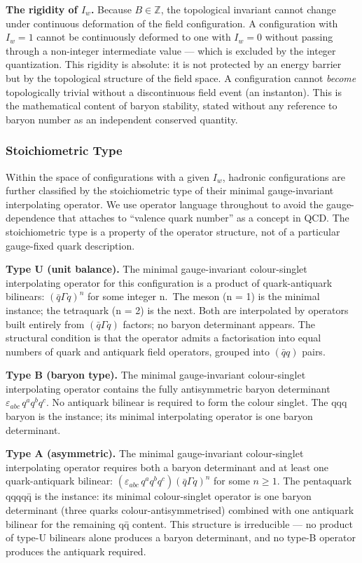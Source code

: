 \textbf{The rigidity of \(I_w\).} Because \(B \in \mathbb{Z}\), the
topological invariant cannot change under continuous deformation of the
field configuration. A configuration with \(I_w = 1\) cannot be
continuously deformed to one with \(I_w = 0\) without passing through a
non-integer intermediate value --- which is excluded by the integer
quantization. This rigidity is absolute: it is not protected by an
energy barrier but by the topological structure of the field space. A
configuration cannot \emph{become} topologically trivial without a
discontinuous field event (an instanton). This is the mathematical
content of baryon stability, stated without any reference to baryon
number as an independent conserved quantity.

\hypertarget{stoichiometric-type}{%
\subsubsection{Stoichiometric Type}\label{stoichiometric-type}}

Within the space of configurations with a given \(I_w\), hadronic
configurations are further classified by the stoichiometric type of
their minimal gauge-invariant interpolating operator. We use operator
language throughout to avoid the gauge-dependence that attaches to
``valence quark number'' as a concept in QCD. The stoichiometric type is
a property of the operator structure, not of a particular gauge-fixed
quark description.

\textbf{Type U (unit balance).} The minimal gauge-invariant
colour-singlet interpolating operator for this configuration is a
product of quark-antiquark bilinears: \((\bar{q}\Gamma q)^n\) for some
integer n.~The meson (n = 1) is the minimal instance; the tetraquark (n
= 2) is the next. Both are interpolated by operators built entirely from
\((\bar{q}\Gamma q)\) factors; no baryon determinant appears. The
structural condition is that the operator admits a factorisation into
equal numbers of quark and antiquark field operators, grouped into
\((\bar{q}q)\) pairs.

\textbf{Type B (baryon type).} The minimal gauge-invariant
colour-singlet interpolating operator contains the fully antisymmetric
baryon determinant \(\varepsilon_{abc}\,q^a q^b q^c\). No antiquark
bilinear is required to form the colour singlet. The qqq baryon is the
instance; its minimal interpolating operator is one baryon determinant.

\textbf{Type A (asymmetric).} The minimal gauge-invariant colour-singlet
interpolating operator requires both a baryon determinant and at least
one quark-antiquark bilinear:
\((\varepsilon_{abc}\,q^a q^b q^c)(\bar{q}\Gamma q)^n\) for some
\(n \geq 1\). The pentaquark qqqqq̄ is the instance: its minimal
colour-singlet operator is one baryon determinant (three quarks
colour-antisymmetrised) combined with one antiquark bilinear for the
remaining qq̄ content. This structure is irreducible --- no product of
type-U bilinears alone produces a baryon determinant, and no type-B
operator produces the antiquark required.

